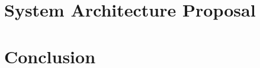 \documentclass[
  oneside,
  11pt, a4paper,
  footinclude=true,
  headinclude=true,
  cleardoublepage=empty
]{scrbook}
\begin{document}
	\chapter{System Architecture Proposal}
	

	
	\chapter{Conclusion}
	
			
	\cleardoublepage

	
\end{document}
